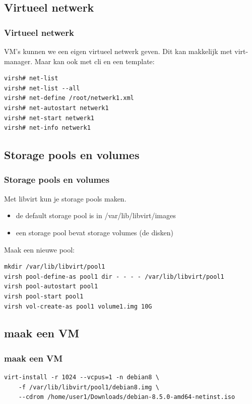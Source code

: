 \subsection {Virtueel netwerk}
\begin{styleframefrag}
    \frametitle{Virtueel netwerk}
VM's kunnen we een eigen virtueel netwerk geven.
Dit kan makkelijk met virt-manager.
Maar kan ook met cli en een template:
\pause
\scriptsize
\begin{verbatim}
virsh# net-list
virsh# net-list --all
virsh# net-define /root/netwerk1.xml
virsh# net-autostart netwerk1
virsh# net-start netwerk1
virsh# net-info netwerk1
\end{verbatim}
\end{styleframefrag}

\subsection{Storage pools en volumes}
\begin{styleframefrag}
    \frametitle{Storage pools en volumes}
Met libvirt kun je storage pools maken.
\begin{itemize}
	\item de default storage pool is in /var/lib/libvirt/images
	\item een storage pool bevat storage volumes (de disken)
\end{itemize}
Maak een nieuwe pool:
\scriptsize
\begin{verbatim}
mkdir /var/lib/libvirt/pool1
virsh pool-define-as pool1 dir - - - - /var/lib/libvirt/pool1
virsh pool-autostart pool1
virsh pool-start pool1
virsh vol-create-as pool1 volume1.img 10G                                                                                   
\end{verbatim}
\end{styleframefrag}

\subsection {maak een VM}
\begin{styleframefrag}
    \frametitle{maak een VM}
\scriptsize
\begin{verbatim}
virt-install -r 1024 --vcpus=1 -n debian8 \
    -f /var/lib/libvirt/pool1/debian8.img \
    --cdrom /home/user1/Downloads/debian-8.5.0-amd64-netinst.iso
\end{verbatim}
\end{styleframefrag}

